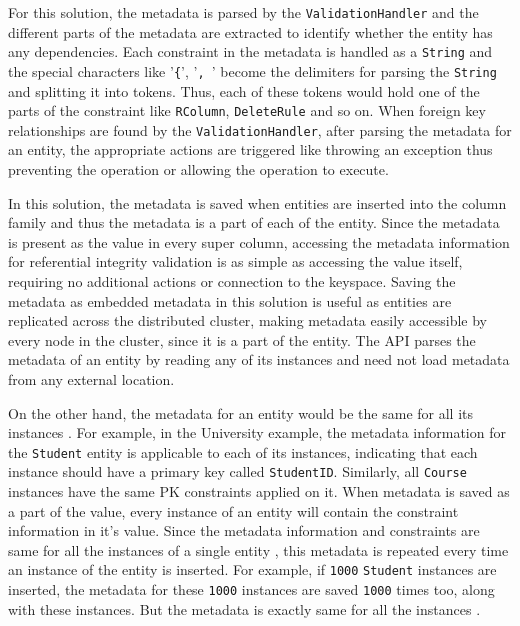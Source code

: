 	For this solution,  the metadata is
	parsed by the \texttt{ValidationHandler} and  the different parts of the
	metadata are extracted to identify whether the entity has any dependencies.   
	Each constraint in the metadata is handled as a
	\texttt{String} and the special characters like '\texttt{\{}',  '\texttt{, }'
	become the delimiters for parsing the \texttt{String} and splitting it into tokens.  
	Thus,  each of these tokens
	would hold one of the parts of the constraint like \texttt{RColumn}, 
	\texttt{DeleteRule} and so on. 
	When foreign key relationships are found by the
	\texttt{ValidationHandler}, after parsing the metadata for an entity,  the
	appropriate actions are triggered like throwing an exception thus preventing the operation 
	or allowing the operation to execute. 
	
	In this solution, the metadata is saved  when entities are inserted into the
	column family and thus the metadata is a part of each of the entity.  Since the
	metadata is present as the value in every super column,  accessing the metadata
	information for referential integrity validation is as simple as accessing the
	value itself,  requiring no additional actions or connection to the
	keyspace. Saving the metadata as embedded metadata in this solution is useful
	as entities are replicated across the distributed cluster, making metadata
	easily accessible by every node in the cluster, since it is a part of the
	entity.
	The \ac{API} parses the metadata of an entity by reading any of its instances and need not load metadata from any external location.
	
	On the other hand,  the metadata for an entity would be the same for all its
	instances .  For example,  in the University example,  the metadata
	information for the \texttt{Student} entity is applicable to each of its
	instances,  indicating that each instance  should have a primary key called
	\texttt{StudentID}. 
	Similarly,  all \texttt{Course} instances have the same \ac{PK} constraints
	applied on it.  When metadata is saved as a part of the  value, 
	every instance of an entity will contain the constraint information
	in it's value.  Since the metadata information and constraints are same for all
	the instances of a single entity ,  this metadata is repeated every time an
	instance of the entity is inserted.  For example,  if 
	\texttt{1000} \texttt{Student} instances are inserted,  the metadata for these
	\texttt{1000} instances are saved \texttt{1000} times too, along with these
	instances.  But the metadata is exactly same for all the
	instances . 
	
